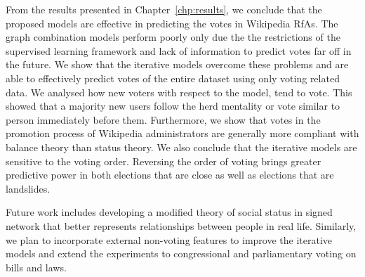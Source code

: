 From the results presented in Chapter~\ref{chp:results}, we conclude that the proposed models are effective in predicting the votes in Wikipedia RfAs.
The graph combination models perform poorly only due the the restrictions of the supervised learning framework and lack of information to predict votes far off in the future.
We show that the iterative models overcome these problems and are able to effectively predict votes of the entire dataset using only voting related data.
We analysed how new voters with respect to the model, tend to vote.
This showed that a majority new users follow the herd mentality or vote similar to person immediately before them.
Furthermore, we show that votes in the promotion process of Wikipedia administrators are generally more compliant with balance theory than status theory.
We also conclude that the iterative models are sensitive to the voting order.
Reversing the order of voting brings greater predictive power in both elections that are close as well as elections that are landslides.

Future work includes developing a modified theory of social status in signed network that better represents relationships between people in real life. Similarly, we plan to incorporate external non-voting features to improve the iterative models and extend the experiments to congressional and parliamentary voting on bills and laws. 

